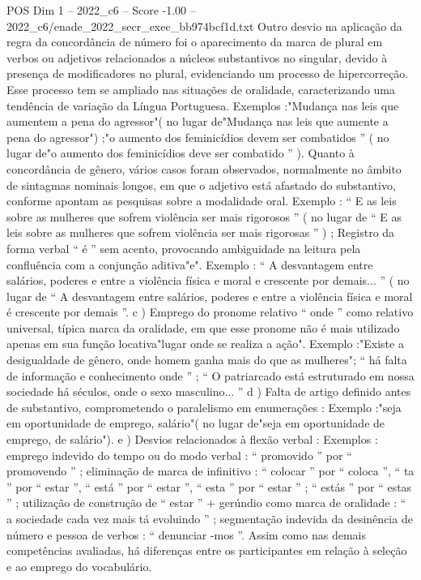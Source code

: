 \begin{textsample}{POS Dim 1 – 2022\_c6 – Score -1.00 – 2022\_c6/enade\_2022\_secr\_exec\_bb974bcf1d.txt}
Outro desvio na aplicação da regra da concordância de número foi o aparecimento da marca de plural em verbos ou adjetivos relacionados a núcleos substantivos no singular, devido à presença de modificadores no plural, evidenciando um processo de hipercorreção.
Esse processo tem se ampliado nas situações de oralidade, caracterizando uma tendência de variação da Língua Portuguesa.
Exemplos :"Mudança nas leis que aumentem a pena do agressor"( no lugar de"Mudança nas leis que aumente a pena do agressor") ;"o aumento dos feminicídios devem ser combatidos ” ( no lugar de"o aumento dos feminicídios deve ser combatido ” ).
Quanto à concordância de gênero, vários casos foram observados, normalmente no âmbito de sintagmas nominais longos, em que o adjetivo está afastado do substantivo, conforme apontam as pesquisas sobre a modalidade oral.
Exemplo : “ E as leis sobre as mulheres que sofrem violência ser mais rigorosos ” ( no lugar de “ E as leis sobre as mulheres que sofrem violência ser mais rigorosas ” ) ; Registro da forma verbal “ é ” sem acento, provocando ambiguidade na leitura pela confluência com a conjunção aditiva"e".
Exemplo : “ A desvantagem entre salários, poderes e entre a violência física e moral e crescente por demais... ” ( no lugar de “ A desvantagem entre salários, poderes e entre a violência física e moral é crescente por demais ”. c ) Emprego do pronome relativo “ onde ” como relativo universal, típica marca da oralidade, em que esse pronome não é mais utilizado apenas em sua função locativa"lugar onde se realiza a ação".
Exemplo :"Existe a desigualdade de gênero, onde homem ganha mais do que as mulheres"; “ há falta de informação e conhecimento onde ” ; “ O patriarcado está estruturado em nossa sociedade há séculos, onde o sexo masculino... ” d ) Falta de artigo definido antes de substantivo, comprometendo o paralelismo em enumerações : Exemplo :"seja em oportunidade de emprego, salário"( no lugar de"seja em oportunidade de emprego, de salário"). e ) Desvios relacionados à flexão verbal : Exemplos : emprego indevido do tempo ou do modo verbal : “ promovido ” por “ promovendo ” ; eliminação de marca de infinitivo : “ colocar ” por “ coloca ”, “ ta ” por “ estar ”, “ está ” por “ estar ”, “ esta ” por “ estar ” ; “ estás ” por “ estas ” ; utilização de construção de “ estar ” + gerúndio como marca de oralidade : “ a sociedade cada vez mais tá evoluindo ” ; segmentação indevida da desinência de número e pessoa de verbos : “ denunciar -mos ”.
Assim como nas demais competências avaliadas, há diferenças entre os participantes em relação à seleção e ao emprego do vocabulário.

\end{textsample}
